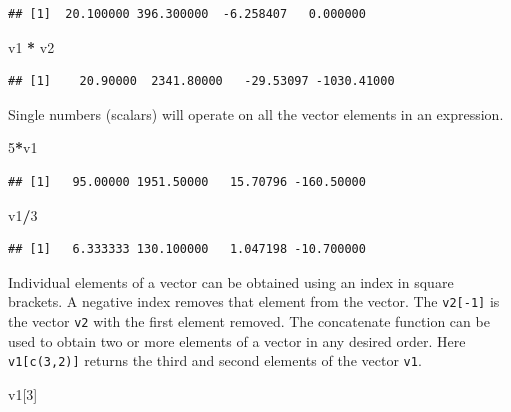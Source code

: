 \documentclass[
]{book}
\newenvironment{Shaded}{\begin{snugshade}}{\end{snugshade}}
\newcommand{\DecValTok}[1]{\textcolor[rgb]{0.00,0.00,0.81}{#1}}
\newcommand{\NormalTok}[1]{#1}
\newcommand{\OperatorTok}[1]{\textcolor[rgb]{0.81,0.36,0.00}{\textbf{#1}}}
\newcommand{\StringTok}[1]{\textcolor[rgb]{0.31,0.60,0.02}{#1}}
\begin{document}
\begin{verbatim}
## [1]  20.100000 396.300000  -6.258407   0.000000
\end{verbatim}

\begin{Shaded}
\begin{Highlighting}[]
\NormalTok{v1 }\OperatorTok{*}\StringTok{ }\NormalTok{v2}
\end{Highlighting}
\end{Shaded}

\begin{verbatim}
## [1]    20.90000  2341.80000   -29.53097 -1030.41000
\end{verbatim}

Single numbers (scalars) will operate on all the vector elements in an expression.

\begin{Shaded}
\begin{Highlighting}[]
\DecValTok{5}\OperatorTok{*}\NormalTok{v1}
\end{Highlighting}
\end{Shaded}

\begin{verbatim}
## [1]   95.00000 1951.50000   15.70796 -160.50000
\end{verbatim}

\begin{Shaded}
\begin{Highlighting}[]
\NormalTok{v1}\OperatorTok{/}\DecValTok{3}
\end{Highlighting}
\end{Shaded}

\begin{verbatim}
## [1]   6.333333 130.100000   1.047198 -10.700000
\end{verbatim}

Individual elements of a vector can be obtained using an index in square brackets. A negative index removes that element from the vector. The \texttt{v2{[}-1{]}} is the vector \texttt{v2} with the first element removed. The concatenate function can be used to obtain two or more elements of a vector in any desired order. Here \texttt{v1{[}c(3,2){]}} returns the third and second elements of the vector \texttt{v1}.

\begin{Shaded}
\begin{Highlighting}[]
\NormalTok{v1[}\DecValTok{3}\NormalTok{]}
\end{Highlighting}
\end{Shaded}
\end{document}
